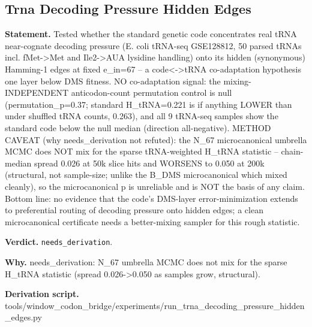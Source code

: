 \subsection{Trna Decoding Pressure Hidden Edges}\label{sec:bridge-trna-decoding-pressure-hidden-edges}
\textbf{Statement.} Tested whether the standard genetic code concentrates real tRNA near-cognate decoding pressure (E.
coli tRNA-seq GSE128812, 50 parsed tRNAs incl. fMet->Met and Ile2->AUA lysidine handling) onto its
hidden (synonymous) Hamming-1 edges at fixed e\_in=67 -- a code<->tRNA co-adaptation hypothesis one
layer below DMS fitness. NO co-adaptation signal: the mixing-INDEPENDENT anticodon-count permutation
control is null (permutation\_p=0.37; standard H\_tRNA=0.221 is if anything LOWER than under
shuffled tRNA counts, 0.263), and all 9 tRNA-seq samples show the standard code below the null
median (direction all-negative). METHOD CAVEAT (why needs\_derivation not refuted): the N\_67
microcanonical umbrella MCMC does NOT mix for the sparse tRNA-weighted H\_tRNA statistic --
chain-median spread 0.026 at 50k slice hits and WORSENS to 0.050 at 200k (structural, not
sample-size; unlike the B\_DMS microcanonical which mixed cleanly), so the microcanonical p is
unreliable and is NOT the basis of any claim. Bottom line: no evidence that the code's DMS-layer
error-minimization extends to preferential routing of decoding pressure onto hidden edges; a clean
microcanonical certificate needs a better-mixing sampler for this rough statistic.

\textbf{Verdict.} \texttt{needs\_derivation}.

\textbf{Why.} needs\_derivation: N\_67 umbrella MCMC does not mix for the sparse H\_tRNA statistic (spread
0.026->0.050 as samples grow, structural).

\textbf{Derivation script.} tools/window\_codon\_bridge/experiments/run\_trna\_decoding\_pressure\_hidden\_edges.py
